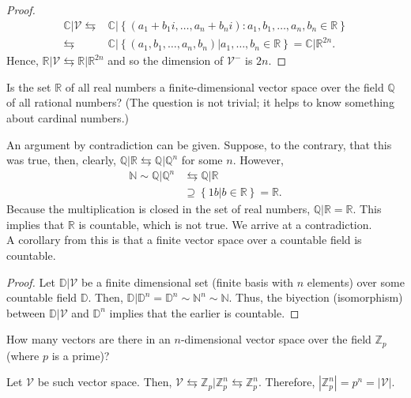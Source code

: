 \documentclass[12pt]{article}
\newcommand{\N}{\mathbb{N}}
\newcommand{\Z}{\mathbb{Z}}
\newcommand{\R}{\mathbb{R}}
\newcommand{\Q}{\mathbb{Q}}
\newenvironment{problem}[2][Problem]{\begin{trivlist} \item[\hskip \labelsep {\bfseries #1}\hskip \labelsep {\bfseries #2.}]}{\end{trivlist}}
\newenvironment{solution}[1][Solution]{\begin{trivlist} \item[\hskip \labelsep {\bfseries #1}]}{\end{trivlist}}
\begin{document}
\begin{problem}{1}
\begin{enumerate}
\begin{solution}
\begin{proof}
\begin{align*}
  \mathbb{C}|\mathcal{V}\leftrightarrows& \mathbb{C}|\left\{ (a_{1}+b_{1}i,\dots,a_{n}+b_{n}i):a_{1},b_{1},\dots,a_{n},b_{n}\in \R \right\} \\
  \leftrightarrows& \mathbb{C}|\left\{ (a_{1},b_{1},\dots,a_{n},b_{n})|a_{1},\dots,b_{n}\in \R\right\} = \mathbb{C}|\mathbb{R}^{2n}.
\end{align*}
Hence, $\mathbb{R}|\mathcal{V}\leftrightarrows \mathbb{R}|\mathbb{R}^{2n}$ and so the dimension of $\mathcal{V}^{-}$ is $2n$.
\end{proof}
\end{solution}
\end{enumerate}
\end{problem}
\begin{problem}{2}
  Is the set $\R$ of all real numbers a finite-dimensional vector space over the field $\Q$ of all rational numbers? (The question is not trivial; it helps to know something about cardinal numbers.)
\begin{solution}
  An argument by contradiction can be given. Suppose, to the contrary, that this was true, then, clearly, $\Q|\R\leftrightarrows \Q|\Q^{n}$ for some $n$. However,
\begin{align*}
  \N \sim \Q|\Q^{n} &\leftrightarrows \Q|\R\\
  &\supseteq \left\{ 1b |  b\in \R\right\} = \R.
\end{align*}
Because the multiplication is closed in the set of real numbers, $\Q|\R = \R$. This implies that $\R$ is countable, which is not true. We arrive at a contradiction.\\
A corollary from this is that a finite vector space  over a countable field is countable.
\begin{proof}
  Let $\mathbb{D}|\mathcal{V}$ be a finite dimensional set (finite basis with $n$ elements) over some countable field $\mathbb{D}$. Then, $\mathbb{D}|\mathbb{D}^{n} = \mathbb{D}^{n} \sim \N^{n} \sim \N$. Thus, the biyection (isomorphism) between $\mathbb{D}|\mathcal{V}$ and $\mathbb{D}^{n}$ implies that the earlier is countable.
\end{proof}
\end{solution}
\end{problem}
\begin{problem}{3}
  How many vectors are there in an $n$-dimensional vector space over the field $\Z_{p}$ (where $p$ is a prime)?
\begin{solution}
  Let $\mathcal{V}$ be such vector space. Then, $\mathcal{V} \leftrightarrows \Z_{p}|\Z_{p}^{n} \leftrightarrows \Z_{p}^{n}$. Therefore, $|\Z_{p}^{n}| = p^{n} = |\mathcal{V}|$.
\end{solution}
\end{problem}
\end{document}
